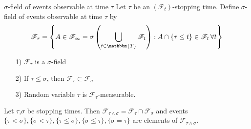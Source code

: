 \documentclass[12pt,a4paper]{article}
\begin{document}
\begin{definition}{$\sigma$-field of events observable at time $\tau$}{}
    Let $\tau$ be an $(\mathscr{F}_t)$-stopping time. Define $\sigma$-field of events observable at time $\tau$ by 
    $$
    \mathscr{F}_\tau = \left\{A\in\mathscr{F}_\infty = \sigma\left(\bigcup_{t\in \mathbbm{T}}\mathscr{F}_t\right): A\cap\{\tau\le t\}\in \mathscr{F}_t\,\forall t\right\}
    $$
\end{definition}
\begin{proposition}{}{}
    \begin{enumerate}
        \item[1)] $\mathscr{F}_\tau$ is a $\sigma$-field
        \item[2)] If $\tau\le \sigma$, then $\mathscr{F}_\tau\subset \mathscr{F}_\sigma$
        \item[3)] Random variable $\tau$ is $\mathscr{F}_\tau$-measurable.
    \end{enumerate}
\end{proposition}
\begin{proposition}{}{}
    Let $\tau$,$\sigma$ be stopping times. Then $\mathscr{F}_{\tau\wedge \sigma} = \mathscr{F}_\tau \cap\mathscr{F}_\sigma$ and events $\{\tau<\sigma\}, \{\sigma<\tau\},\{\tau\le \sigma\},\{\sigma\le \tau\},\{\sigma=\tau\}$ are elements of $\mathscr{F}_{\tau\wedge\sigma}$.
\end{proposition}
\pagebreak
\end{document}
